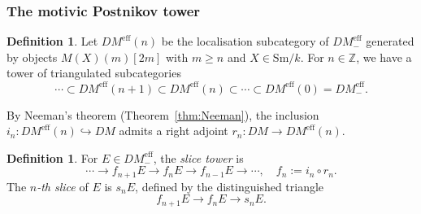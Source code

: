 \documentclass[12pt,a4paper]{article}
\theoremstyle{definition}
\newtheorem{definition}[theorem]{Definition}
\newcommand{\Sm}{\mathrm{Sm}}
\newcommand{\DMeff}{DM^{\mathrm{eff}}_{-}}
\newcommand{\Z}{\mathbb{Z}}
\begin{document}
\subsubsection{The motivic Postnikov tower}\label{subsubsec:postnikov}

\begin{definition}\label{def:DMeff-n}
Let $DM^{\mathrm{eff}}(n)$ be the localisation subcategory of $\DMeff$ generated by
objects $M(X)(m)[2m]$ with $m\geq n$ and $X\in\Sm/k$.  For $n\in\Z$, we have a
tower of triangulated subcategories
\[
  \cdots\subset DM^{\mathrm{eff}}(n+1)\subset DM^{\mathrm{eff}}(n)\subset\cdots
  \subset DM^{\mathrm{eff}}(0)=\DMeff.
\]
\end{definition}

By Neeman's theorem (Theorem~\ref{thm:Neeman}), the inclusion
$i_n:DM^{\mathrm{eff}}(n)\hookrightarrow DM$ admits a right adjoint $r_n:DM\to
DM^{\mathrm{eff}}(n)$.

\begin{definition}\label{def:slice-tower}
For $E\in\DMeff$, the \emph{slice tower} is
\[
  \cdots\to f_{n+1}E\to f_nE\to f_{n-1}E\to\cdots,\quad f_n:=i_n\circ r_n.
\]
The \emph{$n$-th slice} of $E$ is $s_nE$, defined by the distinguished triangle
\[
  f_{n+1}E\longrightarrow f_nE\longrightarrow s_nE.
\]
\end{definition}
\end{document}
